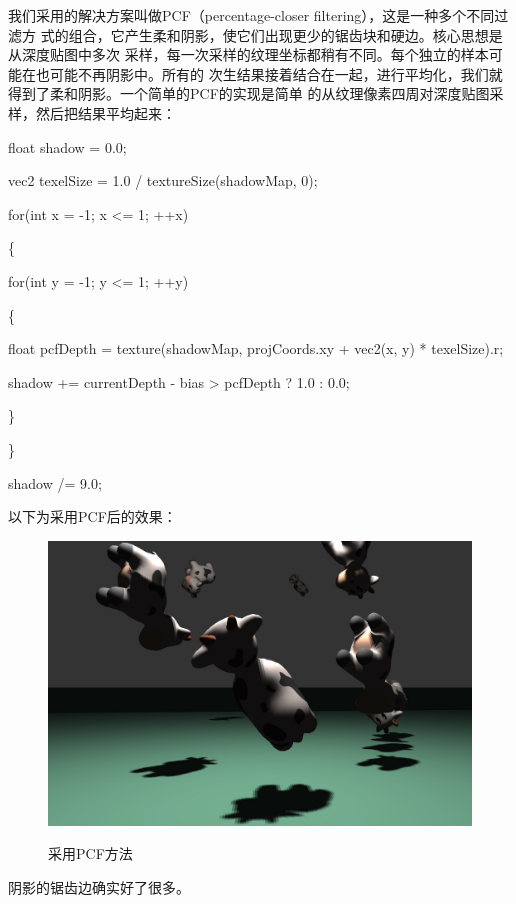 \documentclass{article}
\begin{document}
	我们采用的解决方案叫做PCF（percentage-closer filtering），这是一种多个不同过滤方
	式的组合，它产生柔和阴影，使它们出现更少的锯齿块和硬边。核心思想是从深度贴图中多次
	采样，每一次采样的纹理坐标都稍有不同。每个独立的样本可能在也可能不再阴影中。所有的
	次生结果接着结合在一起，进行平均化，我们就得到了柔和阴影。一个简单的PCF的实现是简单
	的从纹理像素四周对深度贴图采样，然后把结果平均起来：
	\begin{framed}
		float shadow = 0.0;
		
		vec2 texelSize = 1.0 / textureSize(shadowMap, 0);
		
		for(int x = -1; x <= 1; ++x)
		
		\{
			
			for(int y = -1; y <= 1; ++y)
			
			\{
				
				float pcfDepth = texture(shadowMap, projCoords.xy + vec2(x, y) 
				* texelSize).r; 
				
				shadow += currentDepth - bias > pcfDepth ? 1.0 : 0.0; 
				       
			\}    
		
		\}
	
		shadow /= 9.0;
	\end{framed}
	以下为采用PCF后的效果：
	\begin{figure}[htb]
		\caption{\label{table.label} 采用PCF方法} \centering
		\begin{center}
			\includegraphics[width=4.7in]{shadow4.jpg}
			\label{figure.label}
		\end{center}
	\end{figure}
	阴影的锯齿边确实好了很多。
	
\end{document}

